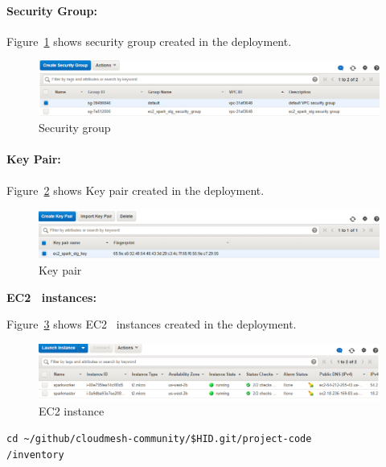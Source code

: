 \paragraph{Security Group:}

Figure~\ref{f:security-group} shows security group created in the deployment.

\begin{figure}[!ht]
	\centering\includegraphics[width=\columnwidth]{images/securitygroup.png}
	\caption{Security group}\label{f:security-group}
\end{figure}

\paragraph{Key Pair:}

Figure~\ref{f:key-pair} shows Key pair created in the deployment.

\begin{figure}[!ht]
	\centering\includegraphics[width=\columnwidth]{images/keypair.png}
	\caption{Key pair}\label{f:key-pair}
\end{figure}

\textbf{EC2~\cite{hid-sp18-511-www-ec2} instances:}

Figure~\ref{f:ec2-instance} shows EC2~\cite{hid-sp18-511-www-ec2}
instances created in the deployment.

\begin{figure}[!ht]
	\centering\includegraphics[width=\columnwidth]{images/ec2instances.png}
	\caption{EC2 instance}\label{f:ec2-instance}
\end{figure}


\begin{verbatim}
cd ~/github/cloudmesh-community/$HID.git/project-code
/inventory
\end{verbatim}

